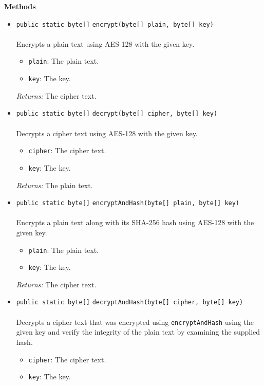 \textbf{\sffamily Methods}
\begin{itemize}
\item \lstinline|public static byte[]| \lstinline|encrypt|\lstinline|(byte[] plain, byte[] key)|\\ \\[-0.6em]
Encrypts a plain text using AES-128 with the given key.
\begin{itemize}
\item \lstinline|plain|: The plain text.
\item \lstinline|key|: The key.
\end{itemize}

\emph{Returns:} The cipher text.

\item \lstinline|public static byte[]| \lstinline|decrypt|\lstinline|(byte[] cipher, byte[] key)|\\ \\[-0.6em]
Decrypts a cipher text using AES-128 with the given key.
\begin{itemize}
\item \lstinline|cipher|: The cipher text.
\item \lstinline|key|: The key.
\end{itemize}

\emph{Returns:} The plain text.

\item \lstinline|public static byte[]| \lstinline|encryptAndHash|\lstinline|(byte[] plain, byte[] key)|\\ \\[-0.6em]
Encrypts a plain text along with its SHA-256 hash using AES-128 with the given key.
\begin{itemize}
\item \lstinline|plain|: The plain text.
\item \lstinline|key|: The key.
\end{itemize}

\emph{Returns:} The cipher text.

\item \lstinline|public static byte[]| \lstinline|decryptAndHash|\lstinline|(byte[] cipher, byte[] key)|\\ \\[-0.6em]
Decrypts a cipher text that was encrypted using \lstinline|encryptAndHash|
 using the given key and verify the integrity of the plain text by
 examining the supplied hash.
\begin{itemize}
\item \lstinline|cipher|: The cipher text.
\item \lstinline|key|: The key.
\end{itemize}


\end{itemize}
